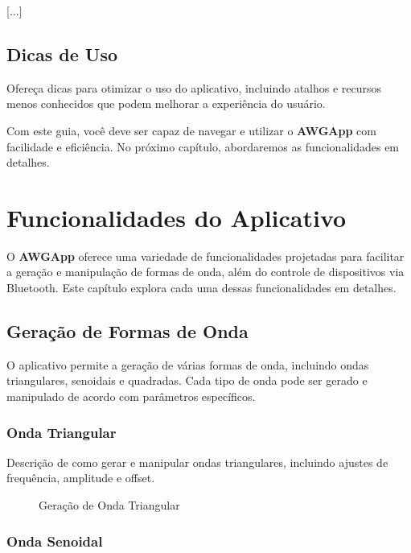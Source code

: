 \documentclass[12pt,a4paper]{book}
\newcommand{\nomesoftware}{AWGApp}
\begin{document}
[...]

\section{Dicas de Uso}

Ofereça dicas para otimizar o uso do aplicativo, incluindo atalhos e recursos menos conhecidos que podem melhorar a experiência do usuário.



Com este guia, você deve ser capaz de navegar e utilizar o \textbf{\nomesoftware{}} com facilidade e eficiência. No próximo capítulo, abordaremos as funcionalidades em detalhes.

\chapter{Funcionalidades do Aplicativo}

O \textbf{\nomesoftware{}} oferece uma variedade de funcionalidades projetadas para facilitar a geração e manipulação de formas de onda, além do controle de dispositivos via Bluetooth. Este capítulo explora cada uma dessas funcionalidades em detalhes.

\section{Geração de Formas de Onda}

O aplicativo permite a geração de várias formas de onda, incluindo ondas triangulares, senoidais e quadradas. Cada tipo de onda pode ser gerado e manipulado de acordo com parâmetros específicos.

\subsection{Onda Triangular}

Descrição de como gerar e manipular ondas triangulares, incluindo ajustes de frequência, amplitude e offset.

\begin{figure}[h]
\centering
\caption{Geração de Onda Triangular}
\end{figure}

\subsection{Onda Senoidal}
\end{document}
